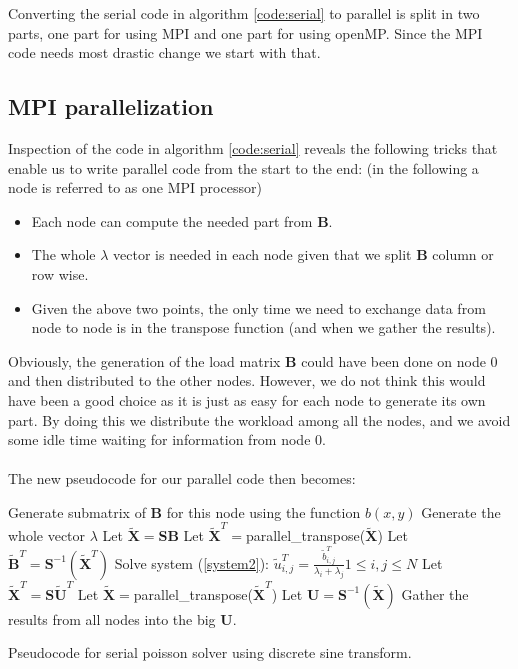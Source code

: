Converting the serial code in algorithm \ref{code:serial} to parallel is split in two parts, one part for using MPI and one part for using openMP. Since the MPI code needs most drastic change we start with that.

\subsection*{MPI parallelization}
Inspection of the code in algorithm \ref{code:serial} reveals the following tricks that enable us to write parallel code from the start to the end: (in the following a node is referred to as one MPI processor)
\begin{itemize}
\item Each node can compute the needed part from $\textbf{B}$.
\item The whole $\lambda$ vector is needed in each node given that we split $\textbf{B}$ column or row wise.
\item Given the above two points, the only time we need to exchange data from node to node is in the transpose function (and when we gather the results).
\end{itemize}
Obviously, the generation of the load matrix $\mathbf{B}$ could have been done on node $0$ and then distributed to the other nodes. However, we do not think this would have been a good choice as it is just as easy for each node to generate its own part. By doing this we distribute the workload among all the nodes, and we avoid some idle time waiting for information from node $0$.\\
\\
The new pseudocode for our parallel code then becomes:\\
\begin{algorithm}[H]
 Generate submatrix of $\textbf{B}$ for this node using the function $b(x,y)$\;
 Generate the whole vector $\lambda$ \;
 Let $\mathbf{\widetilde{X}} = \mathbf{SB}$  \;
 Let $\mathbf{\widetilde{X}}^T = $parallel\_transpose($\mathbf{\widetilde{X}}$)   \;
 Let $\mathbf{\widetilde{B}}^T = \mathbf{S}^{-1}(\mathbf{\widetilde{X}}^T)$ \;
 Solve system (\ref{system2}): $\tilde{u}^T_{i,j} = \frac{\tilde{b}^T_{i,j}}{\lambda_i + \lambda_j} 1 \leq i, j \leq N$\;
 Let $\mathbf{\widetilde{X}}^T = \mathbf{S}\mathbf{\tilde{U}}^T$  \;
 Let $\mathbf{\widetilde{X}} = $parallel\_transpose($\mathbf{\widetilde{X}}^T$)   \;
 Let $\mathbf{U} = \mathbf{S}^{-1}(\mathbf{\widetilde{X}}) $ \;
 Gather the results from all nodes into the big $\mathbf{U}$.
 \caption{Pseudocode for serial poisson solver using discrete sine transform.}
 \label{code:parallel}
\end{algorithm}
